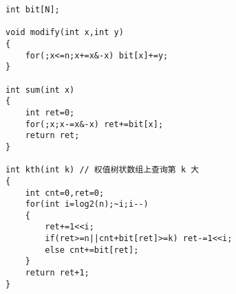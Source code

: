 \begin{lstlisting}
int bit[N];

void modify(int x,int y)
{
	for(;x<=n;x+=x&-x) bit[x]+=y;
}

int sum(int x)
{
    int ret=0;
	for(;x;x-=x&-x) ret+=bit[x];
    return ret;
}

int kth(int k) // 权值树状数组上查询第 k 大
{
    int cnt=0,ret=0;
    for(int i=log2(n);~i;i--)
    {
        ret+=1<<i;
        if(ret>=n||cnt+bit[ret]>=k) ret-=1<<i;
        else cnt+=bit[ret];
    }
    return ret+1;
}
\end{lstlisting}